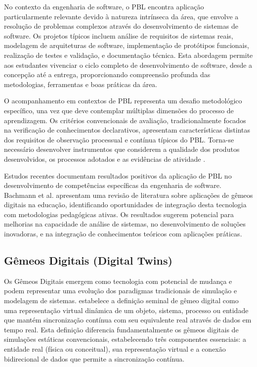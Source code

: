 \documentclass[12pt,a4paper]{article}
\begin{document}
No contexto da engenharia de software, o PBL encontra aplicação particularmente
relevante devido à natureza intrínseca da área, que envolve a resolução de
problemas complexos através do desenvolvimento de sistemas de software. Os
projetos típicos incluem análise de requisitos de sistemas reais, modelagem de
arquiteturas de software, implementação de protótipos funcionais, realização de
testes e validação, e documentação técnica. Esta abordagem permite aos
estudantes vivenciar o ciclo completo de desenvolvimento de software, desde a
concepção até a entrega, proporcionando compreensão profunda das metodologias,
ferramentas e boas práticas da área.

O acompanhamento em contextos de PBL representa um desafio metodológico específico,
una vez que deve contemplar múltiplas dimensões do processo de aprendizagem. Os
critérios convencionais de avaliação, tradicionalmente focados na verificação
de conhecimentos declarativos, apresentam características distintas dos
requisitos de observação processual e contínua típicos do PBL. Torna-se
necessário desenvolver instrumentos que considerem a qualidade dos produtos
desenvolvidos, os processos adotados e as evidências de atividade \cite{hmelo2004}.

Estudos recentes documentam resultados positivos da aplicação de PBL no
desenvolvimento de competências específicas da engenharia de software. Bachmann
et al. apresentam uma revisão de literatura sobre aplicações de gêmeos digitais na educação, identificando oportunidades de
integração desta tecnologia com metodologias pedagógicas ativas. Os resultados
sugerem potencial para melhorias na capacidade de análise de sistemas, no
desenvolvimento de soluções inovadoras, e na integração de conhecimentos
teóricos com aplicações práticas.

\subsection{Gêmeos Digitais (Digital Twins)}

Os Gêmeos Digitais emergem como tecnologia com potencial de mudança e
podem representar uma evolução dos paradigmas tradicionais de simulação e
modelagem de sistemas. \citet{grieves2014} estabelece a definição
seminal de gêmeo digital como uma representação virtual dinâmica de um objeto,
sistema, processo ou entidade que mantém sincronização contínua com seu
equivalente real através de dados em tempo real. Esta definição diferencia
fundamentalmente os gêmeos digitais de simulações estáticas convencionais,
estabelecendo três componentes essenciais: a entidade real (física ou
conceitual), sua representação virtual e a conexão bidirecional de dados que
permite a sincronização contínua.
\end{document}
